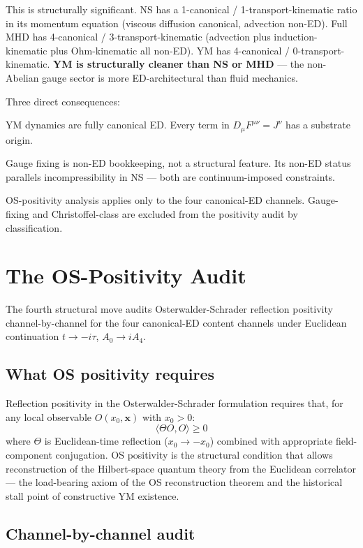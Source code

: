 \documentclass[11pt,a4paper]{article}
\begin{document}
This is structurally significant. NS has a 1-canonical / 1-transport-kinematic ratio in its momentum equation (viscous diffusion canonical, advection non-ED). Full MHD has 4-canonical / 3-transport-kinematic (advection plus induction-kinematic plus Ohm-kinematic all non-ED). YM has 4-canonical / 0-transport-kinematic. \textbf{YM is structurally cleaner than NS or MHD} --- the non-Abelian gauge sector is more ED-architectural than fluid mechanics.

Three direct consequences:

YM dynamics are fully canonical ED. Every term in $D_\mu F^{\mu\nu} = J^\nu$ has a substrate origin.

Gauge fixing is non-ED bookkeeping, not a structural feature. Its non-ED status parallels incompressibility in NS --- both are continuum-imposed constraints.

OS-positivity analysis applies only to the four canonical-ED channels. Gauge-fixing and Christoffel-class are excluded from the positivity audit by classification.

\section{The OS-Positivity Audit}

The fourth structural move audits Osterwalder-Schrader reflection positivity channel-by-channel for the four canonical-ED content channels under Euclidean continuation $t \to -i\tau$, $A_0 \to iA_4$.

\subsection{What OS positivity requires}

Reflection positivity in the Osterwalder-Schrader formulation requires that, for any local observable $O(x_0, \mathbf{x})$ with $x_0 > 0$:
\[
\langle \Theta O, O\rangle \geq 0
\]
where $\Theta$ is Euclidean-time reflection ($x_0 \to -x_0$) combined with appropriate field-component conjugation. OS positivity is the structural condition that allows reconstruction of the Hilbert-space quantum theory from the Euclidean correlator --- the load-bearing axiom of the OS reconstruction theorem and the historical stall point of constructive YM existence.

\subsection{Channel-by-channel audit}
\end{document}
